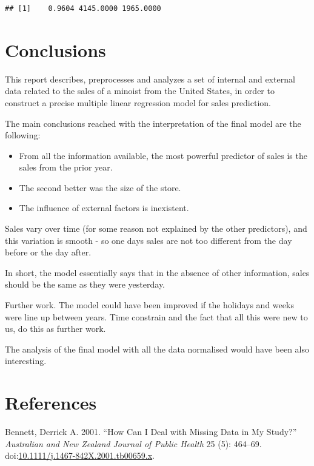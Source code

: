 \documentclass[11pt,]{article}
\providecommand{\tightlist}{%
  \setlength{\itemsep}{0pt}\setlength{\parskip}{0pt}}
\begin{document}
\begin{verbatim}
## [1]    0.9604 4145.0000 1965.0000
\end{verbatim}

\section{Conclusions}\label{conclusions}

This report describes, preprocesses and analyzes a set of internal and
external data related to the sales of a minoist from the United States,
in order to construct a precise multiple linear regression model for
sales prediction.

The main conclusions reached with the interpretation of the final model
are the following:

\begin{itemize}
\tightlist
\item
  From all the information available, the most powerful predictor of
  sales is the sales from the prior year.
\item
  The second better was the size of the store.
\item
  The influence of external factors is inexistent.
\end{itemize}

Sales vary over time (for some reason not explained by the other
predictors), and this variation is smooth - so one days sales are not
too different from the day before or the day after.

In short, the model essentially says that in the absence of other
information, sales should be the same as they were yesterday.

Further work. The model could have been improved if the holidays and
weeks were line up between years. Time constrain and the fact that all
this were new to us, do this as further work.

The analysis of the final model with all the data normalised would have
been also interesting.

\section*{References}\label{references}

\hypertarget{refs}{}
\hypertarget{ref-bennett_how_2001}{}
Bennett, Derrick A. 2001. ``How Can I Deal with Missing Data in My
Study?'' \emph{Australian and New Zealand Journal of Public Health} 25
(5): 464--69.
doi:\href{https://doi.org/10.1111/j.1467-842X.2001.tb00659.x}{10.1111/j.1467-842X.2001.tb00659.x}.
\end{document}
